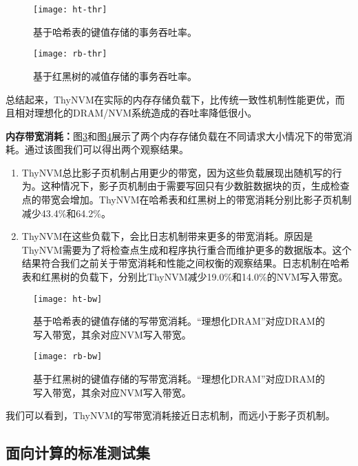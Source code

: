 \begin{figure}[!h]
  \centering
  \texttt{[image: ht-thr]}\\
  \caption{基于哈希表的键值存储的事务吞吐率。}
  \label{fig:ht-thr}
\end{figure}

\begin{figure}[!h]
  \centering
  \texttt{[image: rb-thr]}\\
  \caption{基于红黑树的减值存储的事务吞吐率。}
  \label{fig:rb-thr}
\end{figure}

总结起来，ThyNVM在实际的内存存储负载下，比传统一致性机制性能更优，而且相对理想化的DRAM/NVM系统造成的吞吐率降低很小。 

\textbf{内存带宽消耗：}图\ref{fig:ht-bw}和图\ref{fig:rb-bw}展示了两个内存存储负载在不同请求大小情况下的带宽消耗。通过该图我们可以得出两个观察结果。
\begin{enumerate}
\item ThyNVM总比影子页机制占用更少的带宽，因为这些负载展现出随机写的行为。这种情况下，影子页机制由于需要写回只有少数脏数据块的页，生成检查点的带宽会增加。ThyNVM在哈希表和红黑树上的带宽消耗分别比影子页机制减少43.4\%和64.2\%。
\item ThyNVM在这些负载下，会比日志机制带来更多的带宽消耗。原因是ThyNVM需要为了将检查点生成和程序执行重合而维护更多的数据版本。这个结果符合我们之前关于带宽消耗和性能之间权衡的观察结果。日志机制在哈希表和红黑树的负载下，分别比ThyNVM减少19.0\%和14.0\%的NVM写入带宽。
\end{enumerate}

\begin{figure}[!h]
\centering
\texttt{[image: ht-bw]}\\
\caption{基于哈希表的键值存储的写带宽消耗。``理想化DRAM''对应DRAM的写入带宽，其余对应NVM写入带宽。}
\label{fig:ht-bw}
\end{figure}

\begin{figure}[!h]
\centering
\texttt{[image: rb-bw]}\\
\caption{基于红黑树的键值存储的写带宽消耗。``理想化DRAM''对应DRAM的写入带宽，其余对应NVM写入带宽。}
\label{fig:rb-bw}
\end{figure}

我们可以看到，ThyNVM的写带宽消耗接近日志机制，而远小于影子页机制。

\subsection{面向计算的标准测试集}

